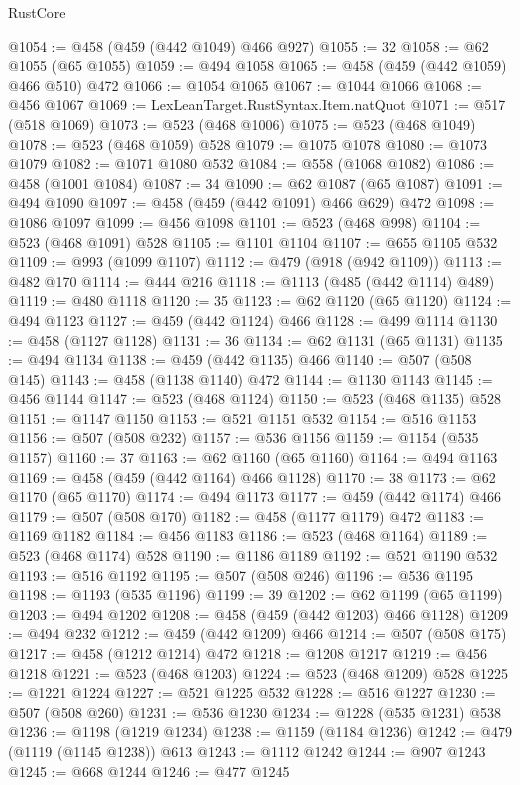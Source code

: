 \begin{lexlean}{RustCore}
\begin{coremodule}
@1054 := @458 (@459 (@442 @1049) @466 @927)
@1055 := 32
@1058 := @62 @1055 (@65 @1055)
@1059 := @494 @1058
@1065 := @458 (@459 (@442 @1059) @466 @510) @472
@1066 := @1054 @1065
@1067 := @1044 @1066
@1068 := @456 @1067
@1069 := LexLeanTarget.RustSyntax.Item.natQuot
@1071 := @517 (@518 @1069)
@1073 := @523 (@468 @1006)
@1075 := @523 (@468 @1049)
@1078 := @523 (@468 @1059) @528
@1079 := @1075 @1078
@1080 := @1073 @1079
@1082 := @1071 @1080 @532
@1084 := @558 (@1068 @1082)
@1086 := @458 (@1001 @1084)
@1087 := 34
@1090 := @62 @1087 (@65 @1087)
@1091 := @494 @1090
@1097 := @458 (@459 (@442 @1091) @466 @629) @472
@1098 := @1086 @1097
@1099 := @456 @1098
@1101 := @523 (@468 @998)
@1104 := @523 (@468 @1091) @528
@1105 := @1101 @1104
@1107 := @655 @1105 @532
@1109 := @993 (@1099 @1107)
@1112 := @479 (@918 (@942 @1109))
@1113 := @482 @170
@1114 := @444 @216
@1118 := @1113 (@485 (@442 @1114) @489)
@1119 := @480 @1118
@1120 := 35
@1123 := @62 @1120 (@65 @1120)
@1124 := @494 @1123
@1127 := @459 (@442 @1124) @466
@1128 := @499 @1114
@1130 := @458 (@1127 @1128)
@1131 := 36
@1134 := @62 @1131 (@65 @1131)
@1135 := @494 @1134
@1138 := @459 (@442 @1135) @466
@1140 := @507 (@508 @145)
@1143 := @458 (@1138 @1140) @472
@1144 := @1130 @1143
@1145 := @456 @1144
@1147 := @523 (@468 @1124)
@1150 := @523 (@468 @1135) @528
@1151 := @1147 @1150
@1153 := @521 @1151 @532
@1154 := @516 @1153
@1156 := @507 (@508 @232)
@1157 := @536 @1156
@1159 := @1154 (@535 @1157)
@1160 := 37
@1163 := @62 @1160 (@65 @1160)
@1164 := @494 @1163
@1169 := @458 (@459 (@442 @1164) @466 @1128)
@1170 := 38
@1173 := @62 @1170 (@65 @1170)
@1174 := @494 @1173
@1177 := @459 (@442 @1174) @466
@1179 := @507 (@508 @170)
@1182 := @458 (@1177 @1179) @472
@1183 := @1169 @1182
@1184 := @456 @1183
@1186 := @523 (@468 @1164)
@1189 := @523 (@468 @1174) @528
@1190 := @1186 @1189
@1192 := @521 @1190 @532
@1193 := @516 @1192
@1195 := @507 (@508 @246)
@1196 := @536 @1195
@1198 := @1193 (@535 @1196)
@1199 := 39
@1202 := @62 @1199 (@65 @1199)
@1203 := @494 @1202
@1208 := @458 (@459 (@442 @1203) @466 @1128)
@1209 := @494 @232
@1212 := @459 (@442 @1209) @466
@1214 := @507 (@508 @175)
@1217 := @458 (@1212 @1214) @472
@1218 := @1208 @1217
@1219 := @456 @1218
@1221 := @523 (@468 @1203)
@1224 := @523 (@468 @1209) @528
@1225 := @1221 @1224
@1227 := @521 @1225 @532
@1228 := @516 @1227
@1230 := @507 (@508 @260)
@1231 := @536 @1230
@1234 := @1228 (@535 @1231) @538
@1236 := @1198 (@1219 @1234)
@1238 := @1159 (@1184 @1236)
@1242 := @479 (@1119 (@1145 @1238)) @613
@1243 := @1112 @1242
@1244 := @907 @1243
@1245 := @668 @1244
@1246 := @477 @1245

\end{coremodule}
\end{lexlean}
